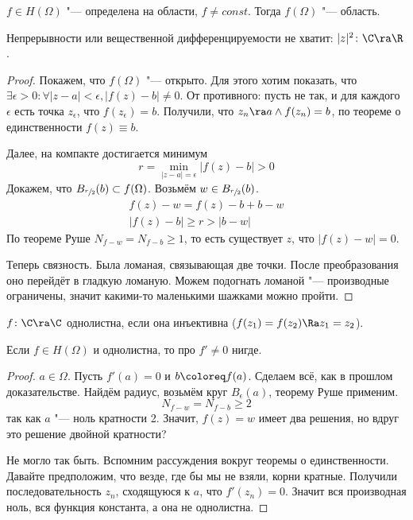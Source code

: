 \begin{Def}
	$f \in H(\Omega)$ "--- определена на области, $f \ne const$.
	Тогда $f(\Omega)$ "--- область.
\end{Def}
\begin{Rem}
	Непрерывности или вещественной дифференцируемости не хватит: $|z|^2\colon \C \ra \R$.
\end{Rem}
\begin{proof}
	Покажем, что $f(\Omega)$ "--- открыто.
	Для этого хотим показать, что $\exists \epsilon > 0\colon \forall |z-a|<\epsilon, |f(z) - b| \ne 0$.
	От противного: пусть не так, и для каждого $\epsilon$ есть точка $z_{\epsilon}$, что $f(z_{\epsilon}) = b$.
	Получили, что $z_n \ra a \land f(z_n) = b$, по теореме о единственности $f(z) \equiv b$.

	Далее, на компакте достигается минимум
	\[ r = \min_{|z-a| = \epsilon} |f(z) - b| > 0 \]
	Докажем, что $B_{\sfrac r2}(b) \subset f(\Omega)$.
	Возьмём $w \in B_{\sfrac r2}(b)$.
	\begin{gather*}
		f(z) - w = f(z) - b + b - w \\
		|f(z) - b| \ge r > |b - w|
	\end{gather*}
	По теореме Руше $N_{f-w} = N_{f-b} \ge 1$, то есть существует $z$, что $|f(z) - w| = 0$.

	Теперь связность.
	Была ломаная, связывающая две точки.
	После преобразования оно перейдёт в гладкую ломаную.
	Можем подогнать ломаной "--- производные ограничены, значит какими-то маленькими шажками можно пройти.
\end{proof}

\begin{Def}
	$f\colon \C \ra \C$ однолистна, если она инъективна ($f(z_1) = f(z_2) \Ra z_1 = z_2$).
\end{Def}

\begin{theorem}
	Если $f \in H(\Omega)$ и однолистна, то про $f' \ne 0$ нигде.
\end{theorem}
\begin{proof}
	$a \in \Omega$. Пусть $f'(a) = 0$ и $b \coloreq f(a)$.
	Сделаем всё, как в прошлом доказательстве.
	Найдём радиус, возьмём круг $B_{\epsilon}(a)$, теорему Руше применим.
	\[ N_{f-w} = N_{f-b} \ge 2 \]
	так как $a$ "--- ноль кратности 2.
	Значит, $f(z) = w$ имеет два решения, но вдруг это решение двойной кратности?

	Не могло так быть. Вспомним рассуждения вокруг теоремы о единственности.
	Давайте предположим, что везде, где бы мы не взяли, корни кратные.
	Получили последовательность $z_n$, сходящуюся к $a$, что $f'(z_n) = 0$.
	Значит вся производная ноль, вся функция константа, а она не однолистна.
\end{proof}
